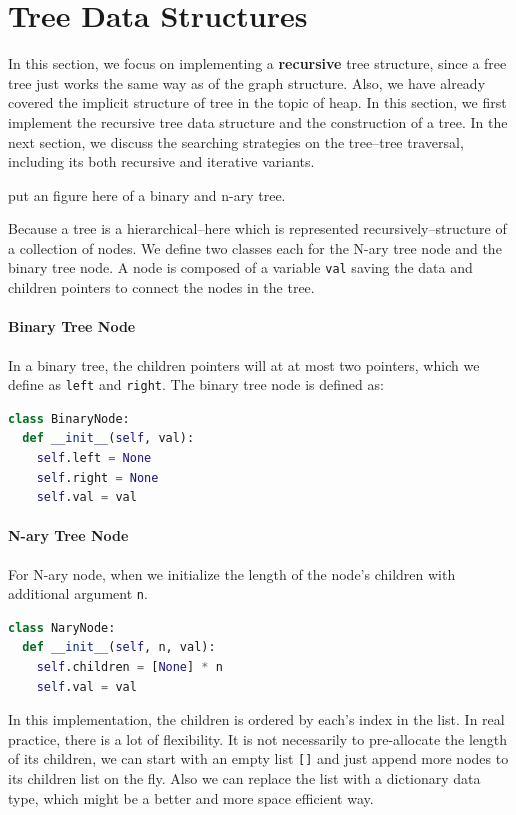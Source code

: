 \documentclass[../main.tex]{subfiles}
\begin{document}
\section{Tree Data Structures}

In this section, we focus on implementing a \textbf{recursive} tree structure, since a free tree just works the same way as of the graph structure. Also, we have already covered the implicit structure of tree in the topic of heap. In this section, we first implement the recursive tree data structure and the construction of a tree. In the next section, we discuss the searching strategies on the tree--tree traversal, including its both recursive and iterative variants.


put an figure here of a binary and n-ary tree.

Because a tree is a hierarchical--here which is represented recursively--structure of a collection of nodes. We define two classes each for the N-ary tree node and the binary tree node. A node is composed of a variable \texttt{val} saving the data and children pointers to connect the nodes in the tree.  


\paragraph{Binary Tree Node} In a binary tree, the children pointers will at at most two pointers, which we define as \texttt{left} and \texttt{right}. The binary tree node is defined as:
\begin{lstlisting}[language = Python]
class BinaryNode:
  def __init__(self, val):
    self.left = None
    self.right = None
    self.val = val
\end{lstlisting}

\paragraph{N-ary Tree Node} For N-ary node, when we initialize the length of the node's children with additional argument \texttt{n}. 
\begin{lstlisting}[language = Python]
class NaryNode:
  def __init__(self, n, val):
    self.children = [None] * n
    self.val = val
\end{lstlisting}
In this implementation, the children is ordered by each's index in the list. In real practice, there is a lot of flexibility. It is not necessarily to pre-allocate the length of its children, we can start with an empty list \texttt{[]} and just append more nodes to its children list on the fly. Also
we can replace the list with a dictionary data type, which might be a better and more space efficient way.  
\end{document}
